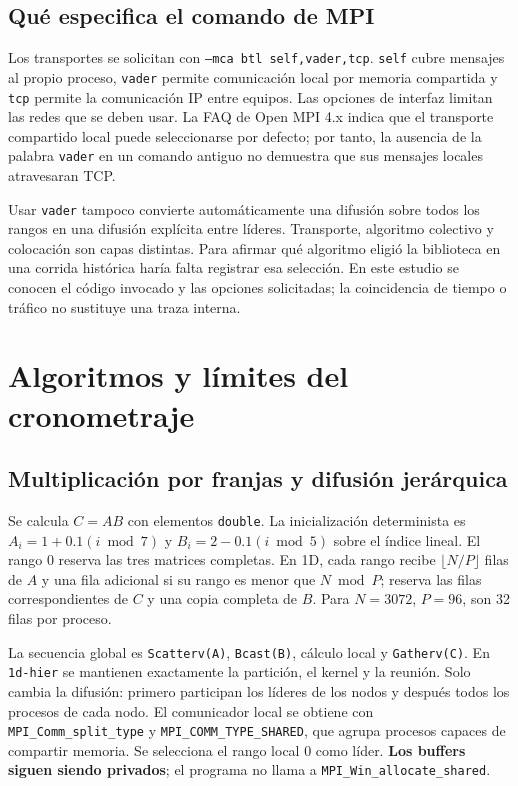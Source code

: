 \subsection{Qué especifica el comando de MPI}

Los transportes se solicitan con \texttt{--mca btl self,vader,tcp}. \texttt{self} cubre mensajes al propio proceso, \texttt{vader} permite comunicación local por memoria compartida y \texttt{tcp} permite la comunicación IP entre equipos. Las opciones de interfaz limitan las redes que se deben usar. La FAQ de Open MPI 4.x indica que el transporte compartido local puede seleccionarse por defecto\cite{ompi-tcp}; por tanto, la ausencia de la palabra \texttt{vader} en un comando antiguo no demuestra que sus mensajes locales atravesaran TCP.

Usar \texttt{vader} tampoco convierte automáticamente una difusión sobre todos los rangos en una difusión explícita entre líderes. Transporte, algoritmo colectivo y colocación son capas distintas. Para afirmar qué algoritmo eligió la biblioteca en una corrida histórica haría falta registrar esa selección. En este estudio se conocen el código invocado y las opciones solicitadas; la coincidencia de tiempo o tráfico no sustituye una traza interna.

\section{Algoritmos y límites del cronometraje}\label{sec:medicion}

\subsection{Multiplicación por franjas y difusión jerárquica}

Se calcula $C=AB$ con elementos \texttt{double}. La inicialización determinista es $A_i=1+0.1(i\bmod7)$ y $B_i=2-0.1(i\bmod5)$ sobre el índice lineal. El rango 0 reserva las tres matrices completas. En 1D, cada rango recibe $\lfloor N/P\rfloor$ filas de $A$ y una fila adicional si su rango es menor que $N\bmod P$; reserva las filas correspondientes de $C$ y una copia completa de $B$. Para $N=3072$, $P=96$, son 32 filas por proceso.

La secuencia global es \texttt{Scatterv(A)}, \texttt{Bcast(B)}, cálculo local y \texttt{Gatherv(C)}. En \texttt{1d-hier} se mantienen exactamente la partición, el kernel y la reunión. Solo cambia la difusión: primero participan los líderes de los nodos y después todos los procesos de cada nodo. El comunicador local se obtiene con \texttt{MPI\_Comm\_split\_type} y \texttt{MPI\_COMM\_TYPE\_SHARED}, que agrupa procesos capaces de compartir memoria\cite{ompi-shared}. Se selecciona el rango local 0 como líder. \textbf{Los buffers siguen siendo privados}; el programa no llama a \texttt{MPI\_Win\_allocate\_shared}.

